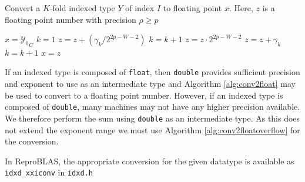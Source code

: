     \begin{samepage}
    \begin{alg}
      Convert a $K$-fold indexed type $Y$ of index $I$ to floating point $x$.
      Here, $z$ is a floating point number with precision $\rho \geq p$
      \begin{algorithmic}[1]
            \State $x = {\mathcal{Y}_0}_C$
            \State \Return
          \EndIf
          \State $k = 1$
            \State $z = z + (\gamma_k / 2^{2 p - W - 2})$
            \State $k = k + 1$
          \EndWhile
          \State $z = z \cdot 2^{2 p - W - 2}$
            \State $z = z + \gamma_k$
            \State $k = k + 1$
          \EndWhile
          \State $x = z$
        \EndFunction
      \end{algorithmic}
      \label{alg:conv2floatoverflow}
    \end{alg}
    \end{samepage}

    If an indexed type is composed of \texttt{float}, then \texttt{double}
    provides sufficient precision and exponent to use as an intermediate type
    and Algorithm \ref{alg:conv2float} may be used to convert to a floating
    point number.  However, if an indexed type is composed of \texttt{double},
    many machines may not have any higher precision available. We therefore
    perform the sum using \texttt{double} as an intermediate type. As this does
    not extend the exponent range we must use Algorithm
    \ref{alg:conv2floatoverflow} for the conversion.

    In ReproBLAS, the appropriate conversion for the given datatype is available as \texttt{idxd\_xxiconv} in \texttt{idxd.h}
